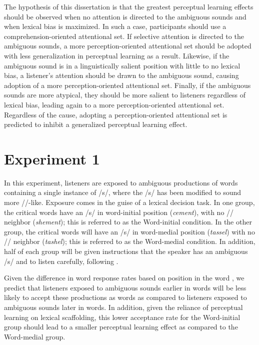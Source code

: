 The hypothesis of this dissertation is that the greatest perceptual learning effects should be observed when no attention is directed to the ambiguous sounds and when lexical bias is maximized.  
In such a case, participants should use a comprehension-oriented attentional set.  
If selective attention is directed to the ambiguous sounds, a more perception-oriented attentional set should be adopted with less generalization in perceptual learning as a result. 
Likewise, if the ambiguous sound is in a linguistically salient position with little to no lexical bias, a listener's attention should be drawn to the ambiguous sound, causing adoption of a more perception-oriented attentional set.  
Finally, if the ambiguous sounds are more atypical, they should be more salient to listeners regardless of lexical bias, leading again to a more perception-oriented attentional set.  
Regardless of the cause, adopting a perception-oriented attentional set is predicted to inhibit a generalized perceptual learning effect.

\section{Experiment 1}

In this experiment, listeners are exposed to ambiguous productions of words containing a single instance of /s/, where the /s/ has been modified to sound more /\textesh/-like.
Exposure comes in the guise of a lexical decision task. 
In one group, the critical words have an /s/ in word-initial position (\emph{cement}), with no /\textesh/ neighbor (\emph{shement}); this is referred to as the Word-initial condition.  
In the other group, the critical words will have an /s/ in word-medial position (\emph{tassel}) with no /\textesh/ neighbor (\emph{tashel}); this is referred to as the Word-medial condition.  
In addition, half of each group will be given instructions that the speaker has an ambiguous /s/ and to listen carefully, following \citet{Pitt2012}.

Given the difference in word response rates based on position in the word \citep{Pitt2012}, we predict that listeners exposed to ambiguous sounds earlier in words will be less likely to accept these productions as words as compared to listeners exposed to ambiguous sounds later in words.  
In addition, given the reliance of perceptual learning on lexical scaffolding, this lower acceptance rate for the Word-initial group should lead to a smaller perceptual learning effect as compared to the Word-medial group.

